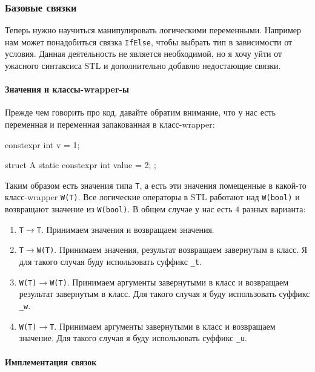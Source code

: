\subsubsection{Базовые связки}

Теперь нужно научиться манипулировать логическими переменными.
Например нам может понадобиться связка \verb"IfElse", чтобы выбрать тип в зависимости от условия.
Данная деятельность не является необходимой, но я хочу уйти от ужасного синтаксиса STL и дополнительно добавлю недостающие связки.

\paragraph{Значения и классы-wrapper-ы}

Прежде чем говорить про код, давайте обратим внимание, что у нас есть переменная и переменная запакованная в класс-wrapper:
\begin{cppcode}
constexpr int v = 1;

struct A {
  static constexpr int value = 2;
};
\end{cppcode}
Таким образом есть значения типа \verb"T", а есть эти значения помещенные в какой-то класс-wrapper \verb"W(T)".
Все логические операторы в STL работают над \verb"W(bool)" и возвращают значение из \verb"W(bool)".
В общем случае у нас есть $4$ разных варианта:
\begin{enumerate}
\item \verb"T"$\to$\verb"T".
Принимаем значения и возвращаем значения.

\item \verb"T"$\to$\verb"W(T)".
Принимаем значения, результат возвращаем завернутым в класс.
Я для такого случая буду использовать суффикс \verb"_t".

\item \verb"W(T)"$\to$\verb"W(T)".
Принимаем аргументы завернутыми в класс и возвращаем результат завернутым в класс.
Для такого случая я буду использовать суффикс \verb"_w".

\item \verb"W(T)"$\to$\verb"T".
Принимаем аргументы завернутыми в класс и возвращаем значение.
Для такого случая я буду использовать суффикс \verb"_u".
\end{enumerate}

\paragraph{Имплементация связок}

